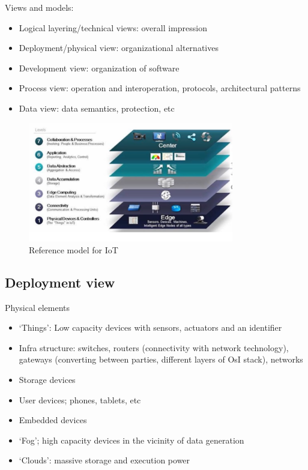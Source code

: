 \documentclass[11pt]{article}
\begin{document}
    Views and models:
    \begin{itemize}
        \item Logical layering/technical views: overall impression
        \item Deployment/physical view: organizational alternatives
        \item Development view: organization of software
        \item Process view: operation and interoperation, protocols, architectural patterns
        \item Data view: data semantics, protection, etc
    \end{itemize}

    \begin{figure}[H]
        \centering
        \includegraphics[width=0.8\textwidth]{img/stack.png}
        \caption{Reference model for IoT}
    \end{figure}

    \subsection{Deployment view}

    Physical elements
    \begin{itemize}
        \item `Things': Low capacity devices with sensors, actuators and an identifier
        \item Infra structure: switches, routers (connectivity with network technology), gateways (converting between parties, different layers of OsI stack), networks
        \item Storage devices
        \item User devices; phones, tablets, etc
        \item Embedded devices
        \item `Fog'; high capacity devices in the vicinity of data generation
        \item `Clouds': massive storage and execution power
    \end{itemize}
\end{document}
